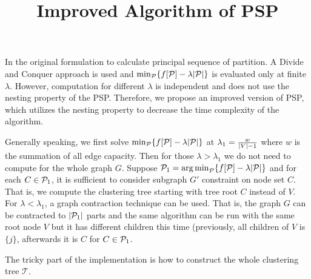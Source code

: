\documentclass{article}
\title{Improved Algorithm of PSP}
\begin{document}
\maketitle

In the original formulation to calculate principal sequence of partition. A Divide and Conquer approach is used and $\min_{\P} \{f[\P]-\lambda \abs{\P}\}$ is evaluated only at finite $\lambda$. However, computation for different $\lambda$ is independent and does not use the nesting property of the PSP. Therefore, we propose an improved version of PSP, which utilizes the nesting property to decrease the time complexity of the algorithm.

Generally speaking, we first solve $\min_{\P} \{ f[\P]-\lambda \abs{\P} \}$ at $\lambda_1 = \frac{w}{\abs{V}-1}$ where $w$ is the summation of all edge capacity. Then for those $\lambda > \lambda_1$ we do not need to compute for the whole graph $G$. Suppose $\P_1 = \argmin_{\P} \{ f[\P]-\lambda \abs{\P} \}$ and for each $ C \in \P_1$, it is sufficient to consider subgraph $G'$ constraint on node set $C$. That is, we compute the clustering tree starting with tree root $C$ instead of $V$. For $\lambda < \lambda_1$, a graph contraction technique can be used. That is, the graph $G$ can be contracted to $\abs{\P_1}$ parts and the same algorithm can be run with the same root node $V$ but it has different children this time (previously, all children of $V$ is $\{j\}$, afterwards it is $C$ for $C \in \P_1$.

The tricky part of the implementation is how to construct the whole clustering tree $\mathcal{T}$.
\end{document}
